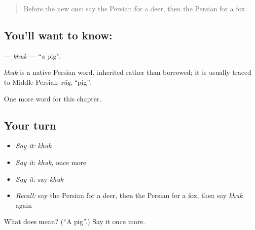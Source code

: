 \label{lesson:FA-C105-khuk}



\begin{quote}
Before the new one: say the Persian for a deer, then the Persian for a fox.
\end{quote}

\subsection*{You'll want to know: }
\textbf{} — \emph{khuk} — \textquotedblleft{}a pig\textquotedblright{}.

\begin{cousinweb}
\emph{khuk} is a native Persian word, inherited rather than borrowed; it is usually traced to Middle Persian \emph{xūg}, \textquotedblleft{}pig\textquotedblright{}.
\end{cousinweb}

\begin{grammarlens}[title={What you've built}]
One more word for this chapter.
\end{grammarlens}

\subsection*{Your turn}
\begin{itemize}
\raggedright
  \item \emph{Say it:} \emph{khuk}
  \item \emph{Say it:} \emph{khuk}, once more
  \item \emph{Say it:} say \emph{khuk}
  \item \emph{Recall:} say the Persian for a deer, then the Persian for a fox, then say \emph{khuk} again
\end{itemize}

\begin{tcolorbox}[breakable,colback=teal!4,colframe=teal!35!black,title={Before you move on}]
What does  mean? (\textquotedblleft{}A pig\textquotedblright{}.) Say it once more.
\end{tcolorbox}
